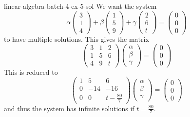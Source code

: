 \documentclass[preview]{standalone}
\begin{document}
\begin{snippetsolution}{linear-algebra-batch-4-ex-5-sol}{}
    We want the system
    \[
        \alpha \begin{pmatrix}
            3 \\ 1 \\ 4
        \end{pmatrix}  
        + \beta \begin{pmatrix}
            1 \\ 5 \\ 9
        \end{pmatrix}
        + \gamma \begin{pmatrix}
            2 \\ 6 \\ t
        \end{pmatrix}
        = \begin{pmatrix}
            0 \\ 0 \\ 0
        \end{pmatrix}  
    \]
    to have multiple solutions. This gives the matrix
    \[
        \begin{pmatrix}
            3 & 1 & 2 \\
            1 & 5 & 6 \\
            4 & 9 & t
        \end{pmatrix}
        \begin{pmatrix}
            \alpha \\ \beta \\ \gamma
        \end{pmatrix}
        =
        \begin{pmatrix}
            0 \\ 0 \\ 0
        \end{pmatrix}
    \]
    This is reduced to
    \[
        \begin{pmatrix}
            1 & 5 & 6 \\
            0 & -14 & -16 \\
            0 & 0 & t - \frac{80}{7}
        \end{pmatrix}
        \begin{pmatrix}
            \alpha \\ \beta \\ \gamma
        \end{pmatrix}
        =
        \begin{pmatrix}
            0 \\ 0 \\ 0
        \end{pmatrix}
    \]
    and thus the system has infinite solutions if \(t = \frac{80}{7}\).
\end{snippetsolution}
\end{document}
